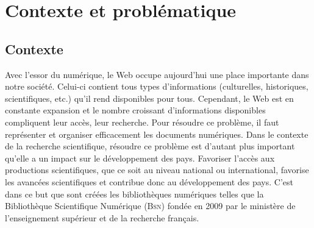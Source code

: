   \chapter{Contexte et problématique}
    \section{Contexte}
      Avec l'essor du numérique, le Web occupe aujourd'hui une place importante
      dans notre société. Celui-ci contient tous types d'informations
      (culturelles, historiques, scientifiques, etc.) qu'il rend disponibles
      pour tous. Cependant, le Web est en constante expansion et le nombre
      croissant d'informations disponibles compliquent leur accès, leur
      recherche. Pour résoudre ce problème, il faut représenter et organiser
      efficacement les documents numériques. Dans le contexte de la recherche
      scientifique, résoudre ce problème est d'autant plus important qu'elle a
      un impact sur le développement des pays. Favoriser l'accès aux productions
      scientifiques, que ce soit au niveau national ou international, favorise
      les avancées scientifiques et contribue donc au développement des pays.
      C'est dans ce but que sont créées les bibliothèques numériques telles que
      la Bibliothèque Scientifique Numérique (\textsc{Bsn}) fondée en 2009 par
      le ministère de l'enseignement supérieur et de la recherche français.

